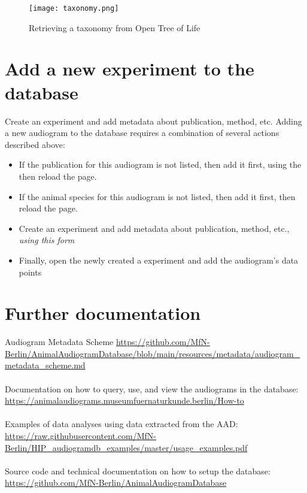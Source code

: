\documentclass{article}
\begin{document}
\begin{figure}
\texttt{[image: taxonomy.png]}
\caption{Retrieving a taxonomy from Open Tree of Life}
\label{fig:taxonomy}
\end{figure}

\section{Add a new experiment to the database}
Create an experiment and add metadata about publication, method, etc.
Adding a new audiogram to the database requires a combination of several actions described above:

\begin{itemize}
\item{If the publication for this audiogram is not listed, then add it first, using the then reload the page.}
\item{If the animal species for this audiogram is not listed, then add it first, then reload the page.}
\item{Create an experiment and add metadata about publication, method, etc., \emph{using this form}}
\item{Finally, open the newly created a experiment and add the audiogram's data points}
\end{itemize}

\section{Further documentation}
Audiogram Metadata Scheme
\url{https://github.com/MfN-Berlin/AnimalAudiogramDatabase/blob/main/resources/metadata/audiogram_metadata_scheme.md}
\\\\
Documentation on how to query, use, and view the audiograms in the database:
\url{https://animalaudiograms.museumfuernaturkunde.berlin/How-to}
\\\\
Examples of data analyses using data extracted from the AAD:
\url{https://raw.githubusercontent.com/MfN-Berlin/HIP_audiogramdb_examples/master/usage_examples.pdf}
\\\\
Source code and technical documentation on how to setup the database: \url{https://github.com/MfN-Berlin/AnimalAudiogramDatabase}
\end{document}

